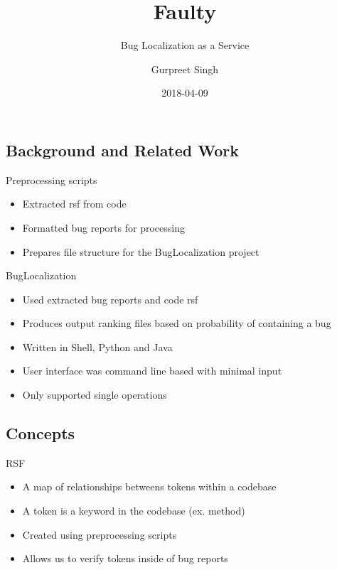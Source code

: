 \documentclass[ignorenonframetext,]{beamer}
\title{Faulty}
\subtitle{Bug Localization as a Service}
\author{Gurpreet Singh}
\date{2018-04-09}
\providecommand{\tightlist}{%
  \setlength{\itemsep}{0pt}\setlength{\parskip}{0pt}}
\begin{document}
\frame{\titlepage}

\subsection{Background and Related
Work}\label{background-and-related-work}

\begin{frame}{Preprocessing scripts}

\begin{itemize}
\tightlist
\item
  Extracted rsf from code
\item
  Formatted bug reports for processing
\item
  Prepares file structure for the BugLocalization project
\end{itemize}

\end{frame}

\begin{frame}{BugLocalization}

\begin{itemize}
\tightlist
\item
  Used extracted bug reports and code rsf
\item
  Produces output ranking files based on probability of containing a bug
\item
  Written in Shell, Python and Java
\item
  User interface was command line based with minimal input
\item
  Only supported single operations
\end{itemize}

\end{frame}

\subsection{Concepts}\label{concepts}

\begin{frame}{RSF}

\begin{itemize}
\tightlist
\item
  A map of relationships betweens tokens within a codebase
\item
  A token is a keyword in the codebase (ex. method)
\item
  Created using preprocessing scripts
\item
  Allows us to verify tokens inside of bug reports
\end{itemize}

\end{frame}
\end{document}
